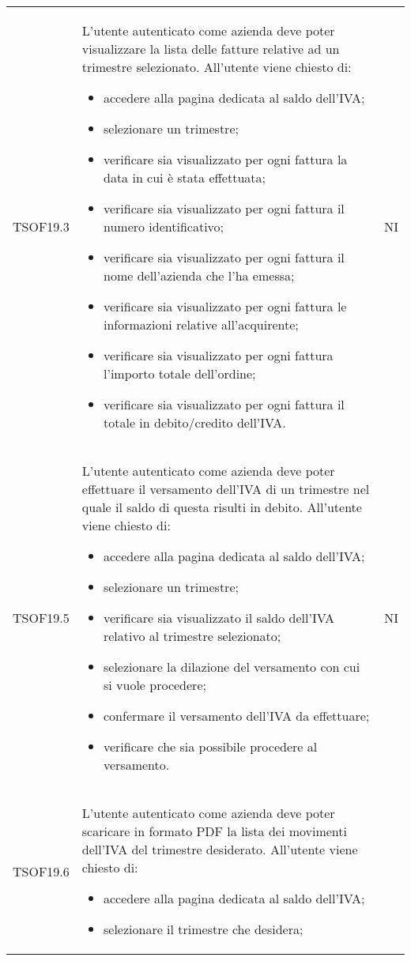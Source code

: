 \begin{longtable}{ >{\centering}p{} >{\centering}p{}
			>{\centering}p{}}
		TSOF19.3	&	L'utente autenticato come azienda deve poter visualizzare la lista delle
		fatture relative ad un trimestre selezionato. All'utente viene chiesto di:
		\begin{itemize}
			\item accedere alla pagina dedicata al saldo dell'IVA;
			\item selezionare un trimestre;
			\item verificare sia visualizzato per ogni fattura la data in cui è stata
			effettuata;
			\item verificare sia visualizzato per ogni fattura il numero identificativo;
			\item verificare sia visualizzato per ogni fattura il nome dell'azienda che
			l'ha emessa;
			\item verificare sia visualizzato per ogni fattura le informazioni relative
			all'acquirente;
			\item verificare sia visualizzato per ogni fattura l'importo totale
			dell'ordine;
			\item verificare sia visualizzato per ogni fattura il totale in debito/credito
			dell'IVA.
		\end{itemize}	&	NI	\tabularnewline
		TSOF19.5	&	L'utente autenticato come azienda deve poter effettuare il versamento 
		dell'IVA di un trimestre nel quale il saldo di questa risulti in debito. All'utente 
		viene chiesto di:
		\begin{itemize}
			\item accedere alla pagina dedicata al saldo dell'IVA;
			\item selezionare un trimestre;
			\item verificare sia visualizzato il saldo dell'IVA relativo al trimestre
			selezionato;
			\item selezionare la dilazione del versamento con cui si vuole procedere;
			\item confermare il versamento dell'IVA da effettuare;
			\item verificare che sia possibile procedere al versamento.
		\end{itemize}
		&	NI	\tabularnewline
		TSOF19.6	&	L'utente autenticato come azienda deve poter scaricare in formato PDF 
		la lista dei movimenti dell'IVA del trimestre desiderato. All'utente viene chiesto 
		di:
		\begin{itemize}
			\item accedere alla pagina dedicata al saldo dell'IVA;
			\item selezionare il trimestre che desidera;

\end{itemize}
\end{longtable}
